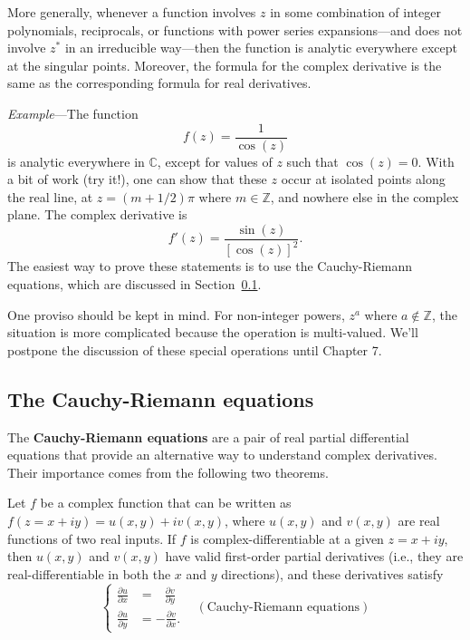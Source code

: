 \documentclass[10pt,a4paper]{article}
\begin{document}
More generally, whenever a function involves $z$ in some combination
of integer polynomials, reciprocals, or functions with power series
expansions---and does not involve $z^*$ in an irreducible way---then
the function is analytic everywhere except at the singular
points. Moreover, the formula for the complex derivative is the same
as the corresponding formula for real derivatives.

\begin{framed}\noindent
  \textit{Example}---The function
  \begin{equation}
    f(z) = \frac{1}{\cos(z)}
  \end{equation}
  is analytic everywhere in $\mathbb{C}$, except for values of $z$
  such that $\cos(z) = 0$.  With a bit of work (try it!), one can show
  that these $z$ occur at isolated points along the real line, at $z =
  (m+1/2)\pi$ where $m \in \mathbb{Z}$, and nowhere else in the
  complex plane. The complex derivative is
  \begin{equation}
    f'(z) = \frac{\sin(z)}{[\cos(z)]^2}.
  \end{equation}
  The easiest way to prove these statements is to use the
  Cauchy-Riemann equations, which are discussed in
  Section~\ref{the-cauchy-riemann-equations}.
\end{framed}

One proviso should be kept in mind. For non-integer powers, $z^a$
where $a\notin \mathbb{Z}$, the situation is more complicated because
the operation is multi-valued. We'll postpone the discussion of these
special operations until Chapter 7.

\subsection{The Cauchy-Riemann equations}
\label{the-cauchy-riemann-equations}

The \textbf{Cauchy-Riemann equations} are a pair of real partial
differential equations that provide an alternative way to understand
complex derivatives. Their importance comes from the following two
theorems.

\begin{framed}
\noindent
Let $f$ be a complex function that can be written as $f(z = x + iy) =
u(x,y) + i v(x,y)$, where $u(x,y)$ and $v(x,y)$ are real functions of
two real inputs. If $f$ is complex-differentiable at a given $z = x +
i y$, then $u(x,y)$ and $v(x,y)$ have valid first-order partial
derivatives (i.e., they are real-differentiable in both the $x$ and
$y$ directions), and these derivatives satisfy
\begin{equation}
  \left\{\begin{aligned} \frac{\partial u}{\partial x} &= \;\;\, \frac{\partial v}{\partial y} \\ \frac{\partial u}{\partial y} &= -\frac{\partial v}{\partial x}.\end{aligned}\right. \;\;\;(\text{Cauchy-Riemann equations})
  \label{cr}
\end{equation}
\end{framed}
\end{document}
